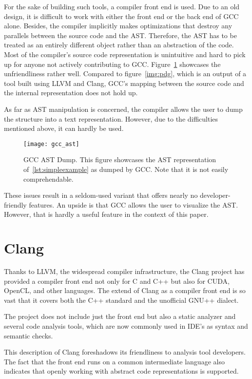 For the sake of building such tools, a compiler front end is used. 
Due to an old design, it is difficult to work with either the front end or 
the back end of GCC alone. 
Besides, the compiler implicitly makes optimizations that destroy any parallels 
between the source code and the AST. 
Therefore, the AST has to be treated as an entirely different object rather than 
an abstraction of the code. 
Most of the compiler's source code representation is unintuitive and 
hard to pick up for anyone not actively contributing to GCC. 
Figure~\ref{img:gcc} showcases the unfriendliness rather well.
Compared to figure~\ref{img:pdg}, which is an output of a tool built using
LLVM and Clang, GCC's mapping between the source code and the internal
representation does not hold up.

As far as AST manipulation is concerned, the compiler allows the user to dump 
the structure into a text representation. 
However, due to the difficulties mentioned above, it can hardly be used.

\begin{figure}[p]\centering
\texttt{[image: gcc\_ast]}
\caption{GCC AST Dump. This figure showcases 
the AST representation of~\ref{lst:simpleexample}
as dumped by GCC. Note that it is not easily comprehendable.}
\label{img:gcc}
\end{figure}

These issues result in a seldom-used variant that offers nearly 
no developer-friendly features. 
An upside is that GCC allows the user to visualize the AST. 
However, that is hardly a useful feature in the context of this paper.

\section{Clang}

Thanks to LLVM, the widespread compiler infrastructure, the Clang project 
has provided a compiler front end not only for C and C++ but also 
for CUDA, OpenCL, and other languages. 
The extend of Clang as a compiler front end is so vast that it covers 
both the C++ standard and the unofficial GNU++ dialect.

The project does not include just the front end but also a static analyzer 
and several code analysis tools, which are now commonly used in IDE's as 
syntax and semantic checks. 

This description of Clang foreshadows its friendliness to analysis tool developers. 
The fact that the front end runs on a common intermediate language also indicates 
that openly working with abstract code representations is supported.

